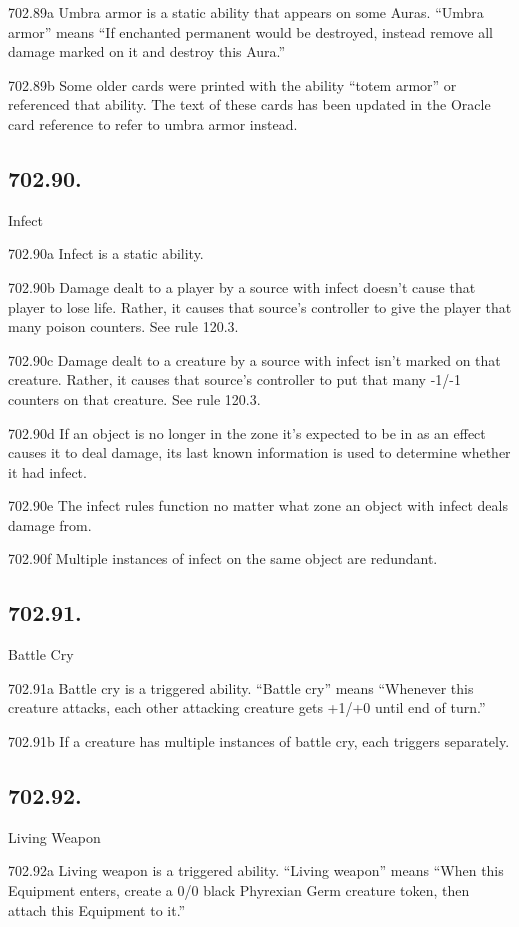 702.89a Umbra armor is a static ability that appears on some Auras. “Umbra armor” means “If enchanted permanent would be destroyed, instead remove all damage marked on it and destroy this Aura.”

702.89b Some older cards were printed with the ability “totem armor” or referenced that ability. The text of these cards has been updated in the Oracle card reference to refer to umbra armor instead.

\subsection*{702.90.}
Infect

702.90a Infect is a static ability.

702.90b Damage dealt to a player by a source with infect doesn’t cause that player to lose life. Rather, it causes that source’s controller to give the player that many poison counters. See rule 120.3.

702.90c Damage dealt to a creature by a source with infect isn’t marked on that creature. Rather, it causes that source’s controller to put that many -1/-1 counters on that creature. See rule 120.3.

702.90d If an object is no longer in the zone it’s expected to be in as an effect causes it to deal damage, its last known information is used to determine whether it had infect.

702.90e The infect rules function no matter what zone an object with infect deals damage from.

702.90f Multiple instances of infect on the same object are redundant.

\subsection*{702.91.}
Battle Cry

702.91a Battle cry is a triggered ability. “Battle cry” means “Whenever this creature attacks, each other attacking creature gets +1/+0 until end of turn.”

702.91b If a creature has multiple instances of battle cry, each triggers separately.

\subsection*{702.92.}
Living Weapon

702.92a Living weapon is a triggered ability. “Living weapon” means “When this Equipment enters, create a 0/0 black Phyrexian Germ creature token, then attach this Equipment to it.”

